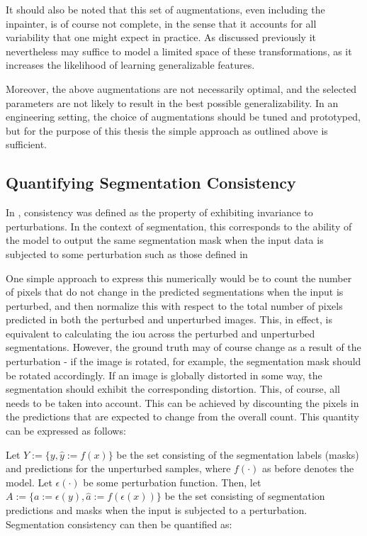 It should also be noted that this set of augmentations, even including the inpainter, is of course not complete, in the sense that it accounts for all variability that one might expect in practice. As discussed previously it nevertheless may suffice to model a limited space of these transformations, as it increases the likelihood of learning generalizable features. 

Moreover, the above augmentations are not necessarily optimal, and the selected parameters are not likely to result in the best possible generalizability. In an engineering setting, the choice of augmentations should be tuned and prototyped, but for the purpose of this thesis the simple approach as outlined above is sufficient. 


\subsection{Quantifying Segmentation Consistency}

In , consistency was defined as the property of exhibiting invariance to perturbations. In the context of segmentation, this corresponds to the ability of the model to output the same segmentation mask when the input data is subjected to some perturbation such as those defined in 

One simple approach to express this numerically would be to count the number of pixels that do not change in the predicted segmentations when the input is perturbed, and then normalize this with respect to the total number of pixels predicted in both the perturbed and unperturbed images. This, in effect, is equivalent to calculating the \gls{iou} across the perturbed and unperturbed segmentations. However, the ground truth may of course change as a result of the perturbation - if the image is rotated, for example, the segmentation mask should be rotated accordingly. If an image is globally distorted in some way, the segmentation should exhibit the corresponding distortion. This, of course, all needs to be taken into account. This can be achieved by discounting the pixels in the predictions that are expected to change from the overall count. This quantity can be expressed as follows:

Let \(Y:=\{y,\hat{y}:=f(x)\}\) be the set consisting of the segmentation labels (masks) and predictions for the unperturbed samples, where \(f(\cdot)\) as before denotes the model. Let \(\epsilon(\cdot)\) be some perturbation function. Then, let \(A:=\{a:=\epsilon(y),\hat{a}:=f(\epsilon(x))\}\) be the set consisting of segmentation predictions and masks when the input is subjected to a perturbation. Segmentation consistency can then be quantified as:

